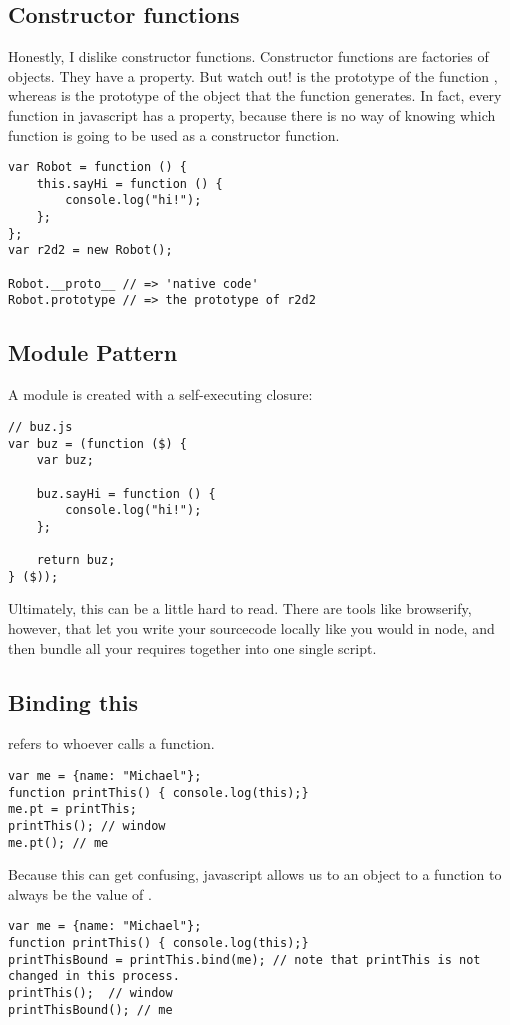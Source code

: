 \subsection{Constructor functions}

Honestly, I dislike constructor functions. 
Constructor functions are factories of objects. They have a   property. But watch out! 
 is the prototype of the function , whereas   is the prototype of the object that the function generates.
In fact, every function in javascript has a   property, because there is no way of knowing which function is going to be used as a constructor function. 

\begin{lstlisting}
var Robot = function () {
    this.sayHi = function () {
        console.log("hi!");
    };
};
var r2d2 = new Robot();

Robot.__proto__ // => 'native code'
Robot.prototype // => the prototype of r2d2
\end{lstlisting}

\subsection{Module Pattern}
A module is created with a self-executing closure: 

\begin{lstlisting}
// buz.js
var buz = (function ($) {
    var buz;
    
    buz.sayHi = function () {
        console.log("hi!");
    };
    
    return buz;
} ($));
\end{lstlisting}

Ultimately, this can be a little hard to read. There are tools like browserify, however, that let you write your sourcecode locally like you would in node, and then bundle all your requires together into one single script. 


\subsection{Binding this}
 refers to whoever calls a function.
\begin{lstlisting}
var me = {name: "Michael"};
function printThis() { console.log(this);}
me.pt = printThis;
printThis(); // window
me.pt(); // me
\end{lstlisting}
Because this can get confusing, javascript allows us to  an object to a function to always be the value of .
\begin{lstlisting}
var me = {name: "Michael"};
function printThis() { console.log(this);}
printThisBound = printThis.bind(me); // note that printThis is not changed in this process. 
printThis();  // window
printThisBound(); // me
\end{lstlisting}



